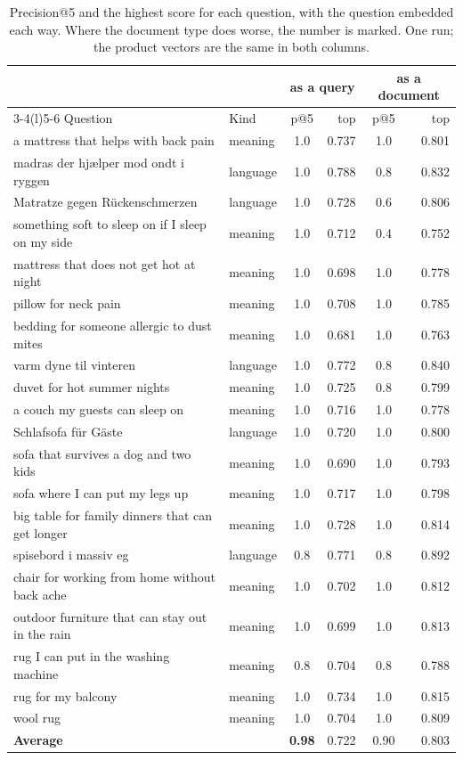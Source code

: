 \documentclass[11pt]{article}
\begin{document}
\begin{table}[H]
\footnotesize
\begin{tabularx}{\textwidth}{@{}X l c r c r@{}}
\toprule
 & & \multicolumn{2}{c}{as a query} & \multicolumn{2}{c}{as a document} \\
\cmidrule(lr){3-4}\cmidrule(l){5-6}
Question & Kind & p@5 & top & p@5 & top \\
\midrule
a mattress that helps with back pain & meaning & 1.0 & 0.737 & 1.0 & 0.801 \\
madras der hjælper mod ondt i ryggen & language & 1.0 & 0.788 & \textcolor{accent}{0.8} & 0.832 \\
Matratze gegen Rückenschmerzen & language & 1.0 & 0.728 & \textcolor{accent}{0.6} & 0.806 \\
something soft to sleep on if I sleep on my side & meaning & 1.0 & 0.712 & \textcolor{accent}{0.4} & 0.752 \\
mattress that does not get hot at night & meaning & 1.0 & 0.698 & 1.0 & 0.778 \\
pillow for neck pain & meaning & 1.0 & 0.708 & 1.0 & 0.785 \\
bedding for someone allergic to dust mites & meaning & 1.0 & 0.681 & 1.0 & 0.763 \\
varm dyne til vinteren & language & 1.0 & 0.772 & \textcolor{accent}{0.8} & 0.840 \\
duvet for hot summer nights & meaning & 1.0 & 0.725 & \textcolor{accent}{0.8} & 0.799 \\
a couch my guests can sleep on & meaning & 1.0 & 0.716 & 1.0 & 0.778 \\
Schlafsofa für Gäste & language & 1.0 & 0.720 & 1.0 & 0.800 \\
sofa that survives a dog and two kids & meaning & 1.0 & 0.690 & 1.0 & 0.793 \\
sofa where I can put my legs up & meaning & 1.0 & 0.717 & 1.0 & 0.798 \\
big table for family dinners that can get longer & meaning & 1.0 & 0.728 & 1.0 & 0.814 \\
spisebord i massiv eg & language & 0.8 & 0.771 & 0.8 & 0.892 \\
chair for working from home without back ache & meaning & 1.0 & 0.702 & 1.0 & 0.812 \\
outdoor furniture that can stay out in the rain & meaning & 1.0 & 0.699 & 1.0 & 0.813 \\
rug I can put in the washing machine & meaning & 0.8 & 0.704 & 0.8 & 0.788 \\
rug for my balcony & meaning & 1.0 & 0.734 & 1.0 & 0.815 \\
wool rug & meaning & 1.0 & 0.704 & 1.0 & 0.809 \\
\midrule
\textbf{Average} & & \textbf{0.98} & 0.722 & 0.90 & 0.803 \\
\bottomrule
\end{tabularx}
\caption{Precision@5 and the highest score for each question, with the
question embedded each way. Where the document type does worse, the
number is marked. One run; the product vectors are the same in both
columns.}
\end{table}
\end{document}
